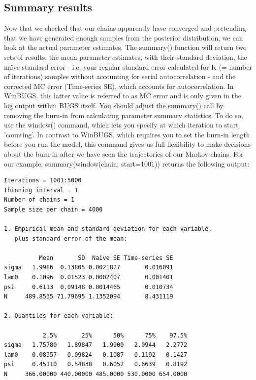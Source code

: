 \subsection{Summary results}
Now that we checked that our chains apparently have converged and pretending that we have generated enough samples from the posterior distribution, we can look at the actual parameter estimates. The summary() function will return two sets of results: the mean parameter estimates, with their standard deviation, the naïve standard error - i.e. your regular standard error calculated for K (= number of iterations) samples without accounting for serial autocorrelation - and the corrected MC error (Time-series SE), which accounts for autocorrelation. In WinBUGS, this latter value is referred to as MC error and is only given in the log output within BUGS itself.
You should adjust the summary() call by removing the burn-in from
calculating parameter summary statistics. To do so, use the window()
command, which lets you specify at which iteration to start
'counting'. In contrast to WinBUGS, which requires you to set the
burn-in length before you run the model, this command gives us full
flexibility to make decisions about the burn-in after we have seen the
trajectories of our Markov chains. For our example,
summary(window(chain, start=1001)) returns the following output:


\begin{verbatim}
Iterations = 1001:5000
Thinning interval = 1
Number of chains = 1
Sample size per chain = 4000

1. Empirical mean and standard deviation for each variable,
   plus standard error of the mean:

          Mean       SD  Naive SE Time-series SE
sigma   1.9986  0.13805 0.0021827       0.016091
lam0    0.1096  0.01523 0.0002407       0.001401
psi     0.6113  0.09148 0.0014465       0.010734
N     489.8535 71.79695 1.1352094       8.431119

2. Quantiles for each variable:

           2.5%       25%      50%      75%    97.5%
sigma   1.75780   1.89847   1.9900   2.0944   2.2772
lam0    0.08357   0.09824   0.1087   0.1192   0.1427
psi     0.45110   0.54838   0.6052   0.6639   0.8192
N     366.00000 440.00000 485.0000 530.0000 654.0000
\end{verbatim}

